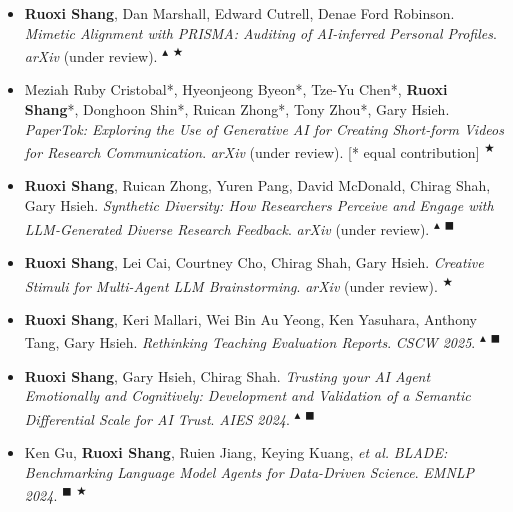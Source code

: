 \documentclass[10pt,a4paper]{article}
\newcommand{\tagRAI}{%
  \textsuperscript{\scriptsize\textcolor{tagpink}{$\blacktriangle$}}%
}
\newcommand{\tagMEAS}{%
  \textsuperscript{\scriptsize\textcolor{tagpink}{$\blacksquare$}}%
}
\newcommand{\tagAGENT}{%
  \textsuperscript{\scriptsize\textcolor{tagpink}{$\bigstar$}}%
}
\begin{document}
\vspace{6pt}


\begin{itemize}[label={},leftmargin=0em,itemindent=0em,parsep=1pt]

  \item \textbf{Ruoxi Shang}, Dan Marshall, Edward Cutrell, Denae Ford Robinson.
  \textit{Mimetic Alignment with PRISMA: Auditing of AI-inferred Personal Profiles}.
  \textit{arXiv} (under review).\hfill\tagRAI\tagAGENT
  \vspace{8pt}
  
  \item Meziah Ruby Cristobal*, Hyeonjeong Byeon*, Tze-Yu Chen*, \textbf{Ruoxi Shang}*, Donghoon Shin*, Ruican Zhong*, Tony Zhou*, Gary Hsieh.
  \textit{PaperTok: Exploring the Use of Generative AI for Creating Short-form Videos for Research Communication}.
  \textit{arXiv} (under review). {\small[* equal contribution]}\hfill\tagAGENT
  \vspace{8pt}
  
  \item \textbf{Ruoxi Shang}, Ruican Zhong, Yuren Pang, David McDonald, Chirag Shah, Gary Hsieh.
  \textit{Synthetic Diversity: How Researchers Perceive and Engage with LLM-Generated Diverse Research Feedback}.
  \textit{arXiv} (under review).\hfill\tagRAI\tagMEAS
  \vspace{8pt}
  
  \item \textbf{Ruoxi Shang}, Lei Cai, Courtney Cho, Chirag Shah, Gary Hsieh.
  \textit{Creative Stimuli for Multi-Agent LLM Brainstorming}.
  \textit{arXiv} (under review).\hfill\tagAGENT
  \vspace{8pt}

  \item \textbf{Ruoxi Shang}, Keri Mallari, Wei Bin Au Yeong, Ken Yasuhara, Anthony Tang, Gary Hsieh.
  \textit{Rethinking Teaching Evaluation Reports}.
  \textit{CSCW 2025}.\hfill\tagRAI\tagMEAS
  \vspace{8pt}

  \item \textbf{Ruoxi Shang}, Gary Hsieh, Chirag Shah.
  \textit{Trusting your AI Agent Emotionally and Cognitively: Development and Validation of a Semantic Differential Scale for AI Trust}.
  \textit{AIES 2024}.\hfill\tagRAI\tagMEAS
  \vspace{8pt}

  \item Ken Gu, \textbf{Ruoxi Shang}, Ruien Jiang, Keying Kuang, \emph{et al.}
  \textit{BLADE: Benchmarking Language Model Agents for Data-Driven Science}.
  \textit{EMNLP 2024}.\hfill\tagMEAS\tagAGENT
  \vspace{8pt}


\end{itemize}
\end{document}
